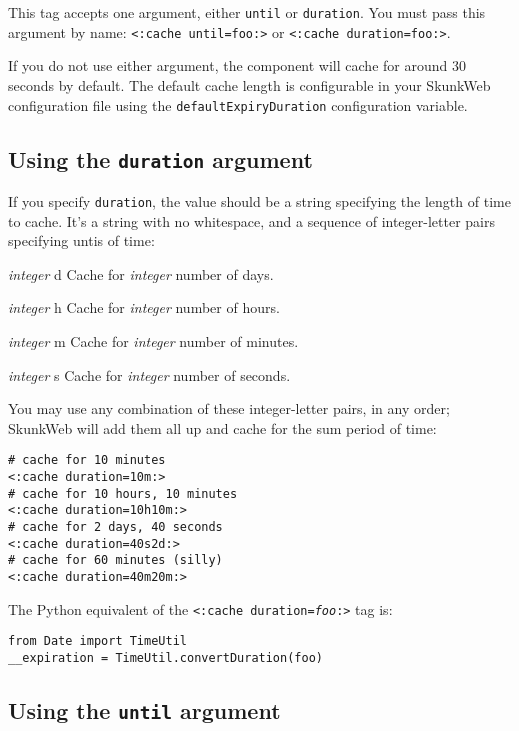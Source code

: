 \documentclass{manual}
\begin{document}
This tag accepts one argument, either \texttt{until}
or \texttt{duration}. You must pass this argument by name:
\texttt{<:cache until=foo:>} or
\texttt{<:cache duration=foo:>}.

If you do not use either argument, the component will cache for around
30 seconds by default. The default cache length is configurable in
your SkunkWeb configuration file using the
\texttt{defaultExpiryDuration} configuration variable.

\subsection{Using the \texttt{duration} argument}

If you specify \texttt{duration}, the value should be 
a string specifying the length of time to cache. It's a 
string with no whitespace, and a sequence of integer-letter
pairs specifying untis of time:

\begin{argdesc}

\item[\emph{integer} d]
Cache for \emph{integer} number of days.
\item[\emph{integer} h]
Cache for \emph{integer} number of hours.
\item[\emph{integer} m]
Cache for \emph{integer} number of minutes.
\item[\emph{integer} s]
Cache for \emph{integer} number of seconds.
\end{argdesc}

You may use any combination of these integer-letter pairs,
in any order; SkunkWeb will add them all up and cache for the sum
period of time:

\begin{verbatim}
# cache for 10 minutes
<:cache duration=10m:>
# cache for 10 hours, 10 minutes
<:cache duration=10h10m:>
# cache for 2 days, 40 seconds
<:cache duration=40s2d:>
# cache for 60 minutes (silly)
<:cache duration=40m20m:>
\end{verbatim}

The Python equivalent of the \texttt{<:cache duration=\emph{foo}:>} tag is:
\begin{verbatim}
from Date import TimeUtil
__expiration = TimeUtil.convertDuration(foo)
\end{verbatim}

\subsection{Using the \texttt{until} argument}
\end{document}
